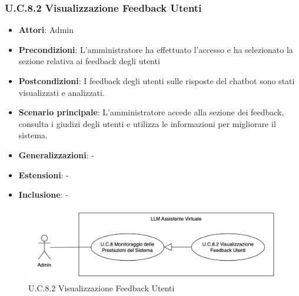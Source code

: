 \subsubsection{U.C.8.2 Visualizzazione Feedback Utenti}
\begin{itemize}
    \item \textbf{Attori}: Admin
    \item \textbf{Precondizioni}: L'amministratore ha effettuato l'accesso e ha selezionato la sezione relativa ai feedback degli utenti
    \item \textbf{Postcondizioni}: I feedback degli utenti sulle risposte del chatbot sono stati visualizzati e analizzati.
    \item \textbf{Scenario principale}: L'amministratore accede alla sezione dei feedback, consulta i giudizi degli utenti e utilizza le informazioni per migliorare il sistema.
    \item \textbf{Generalizzazioni}: -
    \item \textbf{Estensioni}: -
    \item \textbf{Inclusione}: -
\end{itemize}
\begin{figure}[H]
    \centering
    \includegraphics[width=\textwidth]{img/U.C.8.2.png}
    \caption{U.C.8.2 Visualizzazione Feedback Utenti}
\end{figure}
\newpage

